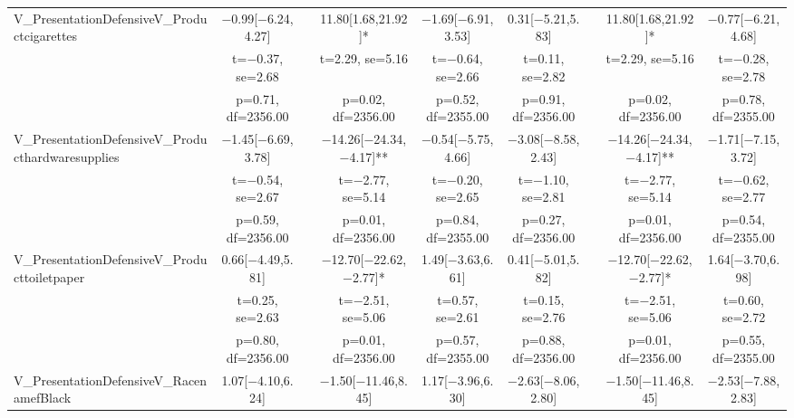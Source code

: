 \documentclass[]{report}
\begin{document}
\begin{table}
{\begin{tabular}[t]{lcccccccc}
		V\_PresentationDefensiveV\_Productcigarettes & \num{-0.99}[\num{-6.24},\num{4.27}] &  & \num{11.80}[\num{1.68},\num{21.92}]* & \num{-1.69}[\num{-6.91},\num{3.53}] & \num{0.31}[\num{-5.21},\num{5.83}] &  & \num{11.80}[\num{1.68},\num{21.92}]* & \num{-0.77}[\num{-6.21},\num{4.68}]\\
		& t=\num{-0.37}, se=\num{2.68} &  & t=\num{2.29}, se=\num{5.16} & t=\num{-0.64}, se=\num{2.66} & t=\num{0.11}, se=\num{2.82} &  & t=\num{2.29}, se=\num{5.16} & t=\num{-0.28}, se=\num{2.78}\\
		& p=\num{0.71}, df=\num{2356.00} &  & p=\num{0.02}, df=\num{2356.00} & p=\num{0.52}, df=\num{2355.00} & p=\num{0.91}, df=\num{2356.00} &  & p=\num{0.02}, df=\num{2356.00} & p=\num{0.78}, df=\num{2355.00}\\
		V\_PresentationDefensiveV\_Producthardwaresupplies & \num{-1.45}[\num{-6.69},\num{3.78}] &  & \num{-14.26}[\num{-24.34},\num{-4.17}]** & \num{-0.54}[\num{-5.75},\num{4.66}] & \num{-3.08}[\num{-8.58},\num{2.43}] &  & \num{-14.26}[\num{-24.34},\num{-4.17}]** & \num{-1.71}[\num{-7.15},\num{3.72}]\\
		& t=\num{-0.54}, se=\num{2.67} &  & t=\num{-2.77}, se=\num{5.14} & t=\num{-0.20}, se=\num{2.65} & t=\num{-1.10}, se=\num{2.81} &  & t=\num{-2.77}, se=\num{5.14} & t=\num{-0.62}, se=\num{2.77}\\
		& p=\num{0.59}, df=\num{2356.00} &  & p=\num{0.01}, df=\num{2356.00} & p=\num{0.84}, df=\num{2355.00} & p=\num{0.27}, df=\num{2356.00} &  & p=\num{0.01}, df=\num{2356.00} & p=\num{0.54}, df=\num{2355.00}\\
		V\_PresentationDefensiveV\_Producttoiletpaper & \num{0.66}[\num{-4.49},\num{5.81}] &  & \num{-12.70}[\num{-22.62},\num{-2.77}]* & \num{1.49}[\num{-3.63},\num{6.61}] & \num{0.41}[\num{-5.01},\num{5.82}] &  & \num{-12.70}[\num{-22.62},\num{-2.77}]* & \num{1.64}[\num{-3.70},\num{6.98}]\\
		& t=\num{0.25}, se=\num{2.63} &  & t=\num{-2.51}, se=\num{5.06} & t=\num{0.57}, se=\num{2.61} & t=\num{0.15}, se=\num{2.76} &  & t=\num{-2.51}, se=\num{5.06} & t=\num{0.60}, se=\num{2.72}\\
		& p=\num{0.80}, df=\num{2356.00} &  & p=\num{0.01}, df=\num{2356.00} & p=\num{0.57}, df=\num{2355.00} & p=\num{0.88}, df=\num{2356.00} &  & p=\num{0.01}, df=\num{2356.00} & p=\num{0.55}, df=\num{2355.00}\\
		V\_PresentationDefensiveV\_RacenamefBlack & \num{1.07}[\num{-4.10},\num{6.24}] &  & \num{-1.50}[\num{-11.46},\num{8.45}] & \num{1.17}[\num{-3.96},\num{6.30}] & \num{-2.63}[\num{-8.06},\num{2.80}] &  & \num{-1.50}[\num{-11.46},\num{8.45}] & \num{-2.53}[\num{-7.88},\num{2.83}]\\

\end{tabular}}
\end{table}
\end{document}
